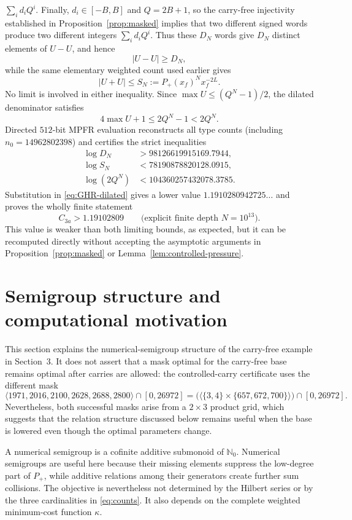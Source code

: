 \documentclass[11pt]{article}
\newcommand{\N}{\mathbb{N}_0}
\newcommand{\card}[1]{\lvert #1\rvert}
\newcommand{\angles}[1]{\langle #1\rangle}
\begin{document}
$\sum_i d_iQ^i$.  Finally, $d_i\in[-B,B]$ and $Q=2B+1$, so the carry-free
injectivity established in Proposition~\ref{prop:masked} implies that two
different signed words produce two different integers $\sum_i d_iQ^i$.
Thus these $D_N$ words give $D_N$ distinct elements of $U-U$, and hence
\[
 \card{U-U}\ge D_N,
\]
while the same elementary weighted count used earlier gives
\[
 \card{U+U}\le S_N:=P_+(x_f)^N x_f^{-2L}.
\]
No limit is involved in either inequality.  Since
$\max U\le(Q^N-1)/2$, the dilated denominator satisfies
\[
 4\max U+1\le2Q^N-1<2Q^N.
\]
Directed $512$-bit MPFR evaluation \cite{FousseEtAl2007} reconstructs all
type counts (including $n_0=14962802398$) and certifies the strict inequalities
\begin{align*}
 \log D_N&>98126619915169.7944,\\
 \log S_N&<78190878820128.0915,\\
 \log(2Q^N)&<104360257432078.3785.
\end{align*}
Substitution in \eqref{eq:GHR-dilated} gives a lower value
$1.1910280942725\ldots$ and proves the wholly finite statement
\begin{equation}\label{eq:finite-certified}
 \boxed{C_{3a}>1.19102809}\qquad\text{(explicit finite depth $N=10^{13}$).}
\end{equation}
This value is weaker than both limiting bounds, as expected, but it can be
recomputed directly without accepting the asymptotic arguments in
Proposition~\ref{prop:masked} or Lemma~\ref{lem:controlled-pressure}.

\section{Semigroup structure and computational motivation}\label{sec:structure}
This section explains the numerical-semigroup structure of the carry-free
example in Section~3.  It does not assert that a mask optimal for
the carry-free base remains optimal after carries are allowed: the
controlled-carry certificate uses the different mask
\[
 \angles{1971,2016,2100,2628,2688,2800}\cap[0,26972]
 =\bigl(\angles{\{3,4\}\times\{657,672,700\}}\bigr)\cap[0,26972].
\]
Nevertheless, both successful masks arise from a $2\times3$ product grid,
which suggests that the relation structure discussed below remains useful
when the base is lowered even though the optimal parameters change.

A numerical semigroup is a cofinite additive submonoid of $\N$.  Numerical
semigroups are useful here because their missing elements suppress the
low-degree part of $P_+$, while additive relations among their generators
create further sum collisions.  The objective is nevertheless not determined
by the Hilbert series or by the three cardinalities in
\eqref{eq:counts}.  It also depends on the complete weighted minimum-cost
function $\kappa$.
\end{document}

